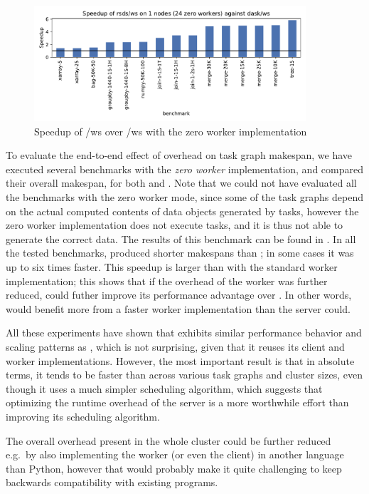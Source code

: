 \begin{figure}
	\centering
	\includegraphics[width=0.9\textwidth]{./imgs/rsds/charts/speedup-zw-rsds-ws-1}
	\caption{Speedup of \rsds{}/ws over \dask{}/ws with the zero worker
	implementation}
	\label{fig:rsds-zero-worker-speedup}
\end{figure}

To evaluate the end-to-end effect of overhead on task graph makespan, we have executed several
benchmarks with the \emph{zero worker} implementation, and compared their overall
makespan, for both \dask{} and \rsds{}. Note that we could
not have evaluated all the benchmarks with the zero worker mode, since some of the task graphs
depend on the actual computed contents of data objects generated by tasks, however the zero worker
implementation does not execute tasks, and it is thus not able to generate the correct data. The
results of this benchmark can be found in . In all the tested
benchmarks, \rsds{} produced shorter makespans than
\dask{}; in some cases it was up to six times faster. This speedup is larger
than with the standard worker implementation; this shows that if the overhead of the worker was
further reduced, \rsds{} could futher improve its performance advantage over
\dask{}. In other words, \rsds{} would benefit more from a
faster worker implementation than the \dask{} server could.

All these experiments have shown that \rsds{} exhibits similar performance
behavior and scaling patterns as \dask{}, which is not surprising, given that
it reuses its client and worker implementations. However, the most important result is that in
absolute terms, it tends to be faster than \dask{} across various task graphs
and cluster sizes, even though it uses a much simpler scheduling algorithm, which suggests that
optimizing the runtime overhead of the \dask{} server is a more worthwhile
effort than improving its scheduling algorithm.

The overall overhead present in the whole \rsds{} cluster could be further
reduced e.g.\ by also implementing the worker (or even the client) in another language than Python,
however that would probably make it quite challenging to keep backwards compatibility with existing
\dask{} programs.


